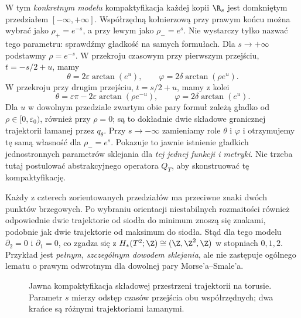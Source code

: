 \begin{przyklad}
W tym \emph{konkretnym modelu}
kompaktyfikacja każdej kopii $\R_s$
jest domkniętym przedziałem $[-\infty,+\infty]$.
Współrzędną kołnierzową przy prawym końcu
można wybrać jako $\rho_+=e^{-s}$,
a przy lewym jako $\rho_-=e^{s}$.
Nie wystarczy tylko nazwać tego parametru:
sprawdźmy gładkość na samych formułach.
Dla $s\to+\infty$ podstawmy $\rho=e^{-s}$.
W przekroju czasowym przy pierwszym przejściu,
$t=-s/2+u$, mamy
\[
 \theta=2\varepsilon\arctan(e^u),\qquad
 \varphi=2\delta\arctan(\rho e^u).
\]
W przekroju przy drugim przejściu,
$t=s/2+u$, mamy z kolei
\[
 \theta=\varepsilon\pi-2\varepsilon
           \arctan(\rho e^{-u}),\qquad
 \varphi=2\delta\arctan(e^u).
\]
Dla $u$ w dowolnym przedziale zwartym
obie pary formuł zależą gładko od
$\rho\in[0,\varepsilon_0)$, również przy $\rho=0$;
są to dokładnie dwie składowe granicznej trajektorii
łamanej przez $q_\theta$.
Przy $s\to-\infty$ zamieniamy role
$\theta$ i $\varphi$ i otrzymujemy tę samą
własność dla $\rho_-=e^s$.
Pokazuje to jawnie istnienie gładkich
jednostronnych parametrów sklejania
dla \emph{tej jednej funkcji i metryki}.
Nie trzeba tutaj postulować
abstrakcyjnego operatora $Q_T$,
aby skonstruować tę kompaktyfikację.

Każdy z czterech zorientowanych przedziałów
ma przeciwne znaki dwóch punktów brzegowych.
Po wybraniu orientacji niestabilnych
rozmaitości również odpowiednie dwie
trajektorie od siodła do minimum
znoszą się znakami, podobnie jak
dwie trajektorie od maksimum do siodła.
Stąd dla tego modelu
$\partial_2=0$ i $\partial_1=0$,
co zgadza się z
$H_*(T^2;\Z)\cong(\Z,\Z^2,\Z)$
w stopniach $0,1,2$.
Przykład jest \emph{pełnym, szczególnym dowodem sklejania},
ale nie zastępuje ogólnego lematu
o prawym odwrotnym dla dowolnej pary Morse'a--Smale'a.
\end{przyklad}

\begin{figure}[!htbp]
\centering
{}
\caption{Jawna kompaktyfikacja składowej przestrzeni
trajektorii na torusie. Parametr $s$ mierzy
odstęp czasów przejścia obu współrzędnych;
dwa krańce są różnymi trajektoriami łamanymi.}
\label{fig:morse-torus-gluing-explicit}
\end{figure}

